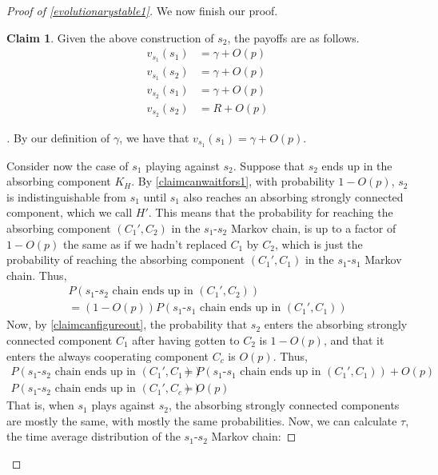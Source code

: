 \documentclass[11pt]{amsart}
\theoremstyle{definition}
\newtheorem{claim}[theorem]{Claim}
\theoremstyle{remark}
\newenvironment{subproof}[1][\proofname]{%
  \renewcommand{\qedsymbol}{$\blacksquare$}%
  \begin{proof}[#1]%
}{%
  \end{proof}%
}
\begin{document}
\begin{proof}[Proof of \cref{evolutionarystable1}]
      We now finish our proof.

      \begin{claim}
        \label{claimpayoffs}
        Given the above construction of $s_2$, the payoffs are as follows.
      \begin{align*}
        v_{s_1}(s_1) &= \gamma + O(p) \\
        v_{s_1}(s_2) &= \gamma + O(p) \\
        v_{s_2}(s_1) &= \gamma + O(p) \\
        v_{s_2}(s_2) &= R + O(p)
      \end{align*}
      \end{claim}
      \begin{subproof}

        By our definition of $\gamma$, we have that $v_{s_1}(s_1) = \gamma + O(p)$.

        Consider now the case of $s_1$ playing against $s_2$. Suppose that $s_2$ ends up in the absorbing component $K_H$. By \cref{claimcanwaitfors1}, with probability $1 - O(p)$, $s_2$ is indistinguishable from $s_1$ until $s_1$ also reaches an absorbing strongly connected component, which we call $H'$. This means that the probability for reaching the absorbing component $(C_1', C_2)$ in the $s_1$-$s_2$ Markov chain, is up to a factor of $1 - O(p)$ the same as if we hadn't replaced $C_1$ by $C_2$, which is just the probability of reaching the absorbing component $(C_1', C_1)$ in the $s_1$-$s_1$ Markov chain. Thus, 
        \begin{multline*}
          P(\text{$s_1$-$s_2$ chain ends up in $(C_1', C_2)$}) \\ = (1 - O(p)) P(\text{$s_1$-$s_1$ chain ends up in $(C_1', C_1)$})
        \end{multline*}
        Now, by \cref{claimcanfigureout}, the probability that $s_2$ enters the absorbing strongly connected component $C_1$ after having gotten to $C_2$ is $1 - O(p)$, and that it enters the always cooperating component $C_c$ is $O(p)$. Thus,
        \begin{align*}
          P(\text{$s_1$-$s_2$ chain ends up in $(C_1',C_1)$}) &= P(\text{$s_1$-$s_1$ chain ends up in $(C_1',C_1)$}) + O(p) \\
          P(\text{$s_1$-$s_2$ chain ends up in $(C_1',C_c)$}) &= O(p)
        \end{align*}
        That is, when $s_1$ plays against $s_2$, the absorbing strongly connected components are mostly the same, with mostly the same probabilities. 
        Now, we can calculate $\tau$, the time average distribution of the $s_1$-$s_2$ Markov chain:


\end{subproof}
\end{proof}
\end{document}
